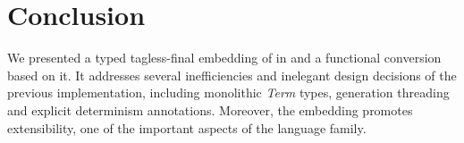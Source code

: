 \section{Conclusion}

We presented a typed tagless-final embedding of \mk in \haskell and a functional conversion based on it. 
It addresses several inefficiencies and inelegant design decisions of the previous implementation, including monolithic \emph{Term} types, generation threading and explicit determinism annotations. 
Moreover, the embedding promotes extensibility, one of the important aspects of the \mk language family. 
